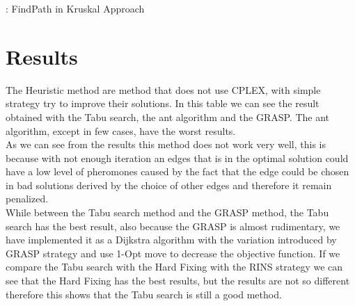 \begin{algorithm}[H]
\caption{: FindPath in Kruskal Approach} \label{alg:SC}
\begin{algorithmic} 
\REPEAT
{}
\end{algorithmic}
\end{algorithm}

\section{Results}
The Heuristic method are method that does not use \textsc{CPLEX}, with simple strategy try to improve their solutions. In this table we can see the result obtained with the Tabu search, the ant algorithm and the GRASP. The ant algorithm, except in few cases, have the worst results.\\
As we can see from the results this method does not work very well, this is because with not enough iteration an edges that is in the optimal solution could have a low level of pheromones caused by the fact that the edge could be chosen in bad solutions derived by the choice of other edges and therefore it remain penalized.\\
While between the Tabu search method and the GRASP method, the Tabu search has the best result, also because the GRASP is almost rudimentary, we have implemented it as a Dijkstra algorithm with the variation introduced by GRASP strategy and use 1-Opt move to decrease the objective function. If we compare the Tabu search with the Hard Fixing with the RINS strategy we can see that the Hard Fixing has the best results, but the results are not so different therefore this shows that the Tabu search is still a good method.\\

